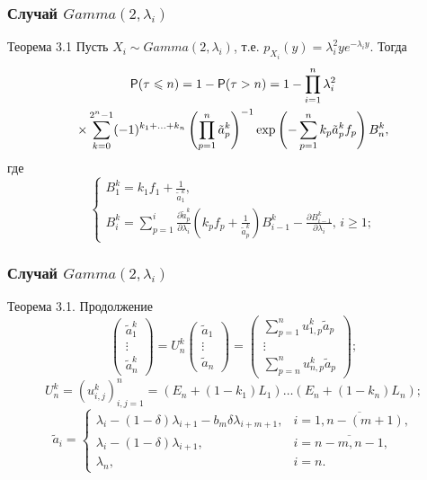 \documentclass[10pt]{beamer}
\newcommand{\p}{{\sf P}}
\theoremstyle{definition}
\theoremstyle{remark}
\begin{document}
\begin{frame}\frametitle{Случай $Gamma(2,\lambda_i)$}
	\begin{block}{Теорема 3.1}\label{main_th}
		\;Пусть $X_i \sim Gamma(2, \lambda_i)$, т.е. $p_{X_i} (y) = \lambda_i^2 y e^{-\lambda_i y}$. Тогда
		\begin{multline}
			\p(\tau \leqslant n) = 1 - \p(\tau>n) = 1 - \prod_{i=1}^n \lambda^2_i \\ \times \sum_{k=0}^{2^n-1} (-1)^{k_1 + \ldots + k_n} \left( \prod_{p=1}^n \tilde a_p^k \right)^{-1} \exp \left(-\sum_{p=1}^n k_p \tilde a_p^k f_p\right) B_n^k,
		\end{multline}
	где $$
	\begin{cases}
		B_1^k = k_1 f_1 + \frac{1}{\tilde a_1^k}, \\
		B_i^k = \sum\limits_{p=1}^i \frac{\partial \tilde a_p^k}{\partial \lambda_i} \left( k_p f_p + \frac{1}{\tilde a_p^k} \right) B_{i-1}^k - \frac{\partial B_{i-1}^k}{\partial \lambda_i},\, i \geqslant 1;
	\end{cases}
	$$
	\end{block}
\end{frame}

\begin{frame}\frametitle{Случай $Gamma(2,\lambda_i)$}
	\begin{block}{Теорема 3.1. Продолжение}
		\begin{equation*}
		\left(\begin{array}{c}\tilde a_1^k \\ \vdots \\ \tilde a_n^k \end{array} \right) = 
		U_n^k
		\left(\begin{array}{c} \tilde a_1 \\ \vdots \\ \tilde a_n \end{array} \right)
		=  \left(\begin{array}{c} \sum\limits_{p=1}^n u_{1,p}^k \tilde a_p \\ \vdots \\ \sum\limits_{p=n}^n u_{n,p}^k \tilde a_p \end{array} \right);
		\end{equation*}
		$$ U_{n}^k = (u_{i,j}^k)_{i,j=1}^{n} = (E_n + (1-k_1)L_1) \ldots (E_n + (1-k_n)L_n); $$
		$$\tilde a_i = 
		\begin{cases} 
			\lambda_i - (1-\delta)\lambda_{i+1} - b_m \delta \lambda_{i+m+1},& i = \overline{1, n-(m+1)}, \\
		 	\lambda_i - (1-\delta)\lambda_{i+1},& i = \overline{n-m, n-1}, \\ 
			\lambda_n,& i = n. 
		\end{cases}$$
	\end{block}
\end{frame}
\end{document}
